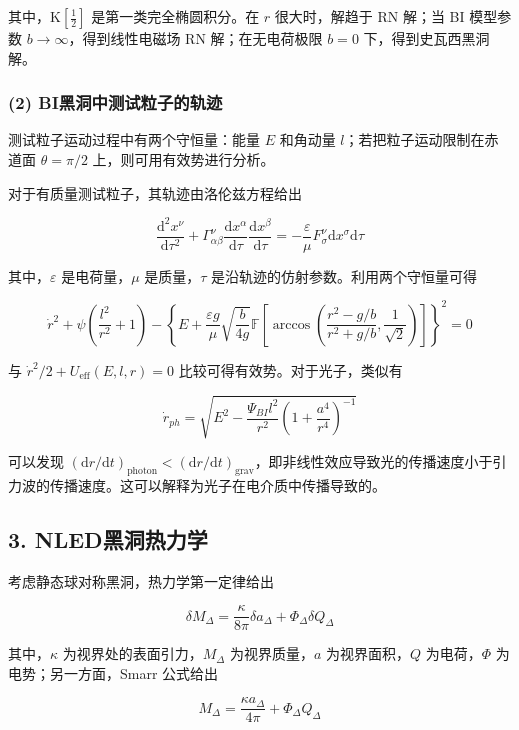 \documentclass[aps,prl,preprint,groupedaddress]{revtex4-2}
\begin{document}
其中，$\mathrm{K}\left[\frac{1 }{2 } \right]$ 是第一类完全椭圆积分。在 $r$ 很大时，解趋于 RN 解；当 BI 模型参数 $b\to\infty$，得到线性电磁场 RN 解；在无电荷极限 $b=0$ 下，得到史瓦西黑洞解。

\subsubsection{(2) BI黑洞中测试粒子的轨迹}


测试粒子运动过程中有两个守恒量：能量 $E$ 和角动量 $l$；若把粒子运动限制在赤道面 $\theta=\pi/2$ 上，则可用有效势进行分析。

对于有质量测试粒子，其轨迹由洛伦兹方程给出

$$
\frac{\mathrm{d}^2 x^\nu }{\mathrm{d}\tau^2 } + \Gamma_{\alpha\beta}^\nu \frac{\mathrm{d}x^\alpha }{\mathrm{d}\tau } \frac{\mathrm{d}x^\beta }{\mathrm{d}\tau } 
=-\frac{\varepsilon }{\mu } F_{\sigma}^{\nu} \mathrm{d}x^\sigma \mathrm{d}\tau
$$

其中，$\varepsilon$ 是电荷量，$\mu$ 是质量，$\tau$ 是沿轨迹的仿射参数。利用两个守恒量可得

$$
\dot{r}^2 + \psi\left(\frac{l^2 }{r^2 } + 1 \right) - \left\{E+\frac{\varepsilon g }{\mu } \sqrt{\frac{b }{4g } } \mathbb{F} \left[\arccos\left(\frac{r^2-g/b }{r^2+g/b }  , \frac{1 }{\sqrt{2} }  \right) \right] \right\}^2=0
$$

与 $\dot{r}^2/2+U_{\mathrm{eff}}(E,l,r)=0$ 比较可得有效势。对于光子，类似有

$$
\dot{r}_{ph}
=\sqrt{E^2 - \frac{\Psi_{BI} l^2 }{r^2 } \left(1+\frac{a^4 }{r^4 }  \right)^{-1}} 
$$

可以发现 $(\mathrm{d}r/\mathrm{d}t)_{\mathrm{photon}}<(\mathrm{d}r/\mathrm{d}t)_{\mathrm{grav}}$，即非线性效应导致光的传播速度小于引力波的传播速度。这可以解释为光子在电介质中传播导致的。

\subsection{3. NLED黑洞热力学}

考虑静态球对称黑洞，热力学第一定律给出

$$
\delta M_{\Delta} = \frac{\kappa }{8\pi } \delta a_{\Delta} + \Phi_\Delta \delta Q_\Delta
$$

其中，$\kappa$ 为视界处的表面引力，$M_\Delta$ 为视界质量，$a$ 为视界面积，$Q$ 为电荷，$\Phi$ 为电势；另一方面，Smarr 公式给出

$$
M_\Delta = \frac{\kappa a_\Delta }{4\pi } + \Phi_\Delta Q_\Delta
$$
\end{document}
